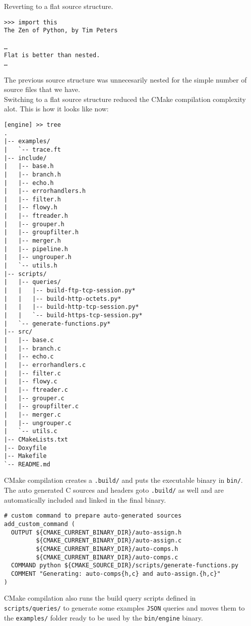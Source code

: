 Reverting to a flat source structure.

\begin{lstlisting}
>>> import this
The Zen of Python, by Tim Peters

…
Flat is better than nested.
…
\end{lstlisting}

The previous source structure was unnecesarily nested for the simple
number of source files that we have.\\Switching to a flat source
structure reduced the CMake compilation complexity alot. This is how it
looks like now:

\begin{lstlisting}
[engine] >> tree
.
|-- examples/
|   `-- trace.ft
|-- include/
|   |-- base.h
|   |-- branch.h
|   |-- echo.h
|   |-- errorhandlers.h
|   |-- filter.h
|   |-- flowy.h
|   |-- ftreader.h
|   |-- grouper.h
|   |-- groupfilter.h
|   |-- merger.h
|   |-- pipeline.h
|   |-- ungrouper.h
|   `-- utils.h
|-- scripts/
|   |-- queries/
|   |   |-- build-ftp-tcp-session.py*
|   |   |-- build-http-octets.py*
|   |   |-- build-http-tcp-session.py*
|   |   `-- build-https-tcp-session.py*
|   `-- generate-functions.py*
|-- src/
|   |-- base.c
|   |-- branch.c
|   |-- echo.c
|   |-- errorhandlers.c
|   |-- filter.c
|   |-- flowy.c
|   |-- ftreader.c
|   |-- grouper.c
|   |-- groupfilter.c
|   |-- merger.c
|   |-- ungrouper.c
|   `-- utils.c
|-- CMakeLists.txt
|-- Doxyfile
|-- Makefile
`-- README.md
\end{lstlisting}

CMake compilation creates a \lstinline!.build/! and puts the executable
binary in \lstinline!bin/!.\\The auto generated C sources and headers
goto \lstinline!.build/! as well and are automatically included and
linked in the final binary.

\begin{lstlisting}
# custom command to prepare auto-generated sources
add_custom_command (
  OUTPUT ${CMAKE_CURRENT_BINARY_DIR}/auto-assign.h
         ${CMAKE_CURRENT_BINARY_DIR}/auto-assign.c
         ${CMAKE_CURRENT_BINARY_DIR}/auto-comps.h
         ${CMAKE_CURRENT_BINARY_DIR}/auto-comps.c
  COMMAND python ${CMAKE_SOURCE_DIR}/scripts/generate-functions.py
  COMMENT "Generating: auto-comps{h,c} and auto-assign.{h,c}"
)
\end{lstlisting}

CMake compilation also runs the build query scripts defined in
\lstinline!scripts/queries/! to generate some examples \lstinline!JSON!
queries and moves them to the \lstinline!examples/! folder ready to be
used by the \lstinline!bin/engine! binary.

